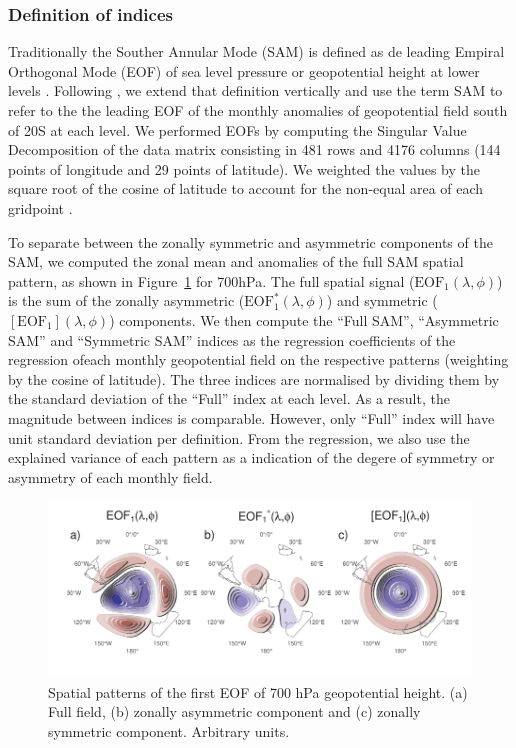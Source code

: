 \documentclass[]{ametsocV5}
\begin{document}
\subsubsection{Definition of indices}

Traditionally the Souther Annular Mode (SAM) is defined as de leading
Empiral Orthogonal Mode (EOF) of sea level pressure or geopotential
height at lower levels \citep{ho2012}. Following \citet{baldwin2001}, we
extend that definition vertically and use the term SAM to refer to the
the leading EOF of the monthly anomalies of geopotential field south of
20\degree S at each level. We performed EOFs by computing the Singular
Value Decomposition of the data matrix consisting in 481 rows and 4176
columns (144 points of longitude and 29 points of latitude). We weighted
the values by the square root of the cosine of latitude to account for
the non-equal area of each gridpoint \citep{chung1999}.

To separate between the zonally symmetric and asymmetric components of
the SAM, we computed the zonal mean and anomalies of the full SAM
spatial pattern, as shown in Figure~\ref{fig:method} for 700hPa. The
full spatial signal (\(\mathrm{EOF_1}(\lambda, \phi)\)) is the sum of
the zonally asymmetric (\(\mathrm{EOF_1^*}(\lambda, \phi)\)) and
symmetric (\([\mathrm{EOF_1}](\lambda, \phi)\)) components. We then
compute the ``Full SAM'', ``Asymmetric SAM'' and ``Symmetric SAM''
indices as the regression coefficients of the regression ofeach monthly
geopotential field on the respective patterns (weighting by the cosine
of latitude). The three indices are normalised by dividing them by the
standard deviation of the ``Full'' index at each level. As a result, the
magnitude between indices is comparable. However, only ``Full'' index
will have unit standard deviation per definition. From the regression,
we also use the explained variance of each pattern as a indication of
the degere of symmetry or asymmetry of each monthly field.

\begin{figure}
\includegraphics{method-1} \caption[Spatial patterns of the first EOF of 700 hPa geopotential height]{Spatial patterns of the first EOF of 700 hPa geopotential height. (a) Full field, (b) zonally asymmetric component and (c) zonally symmetric component. Arbitrary units.}\label{fig:method}
\end{figure}
\end{document}
